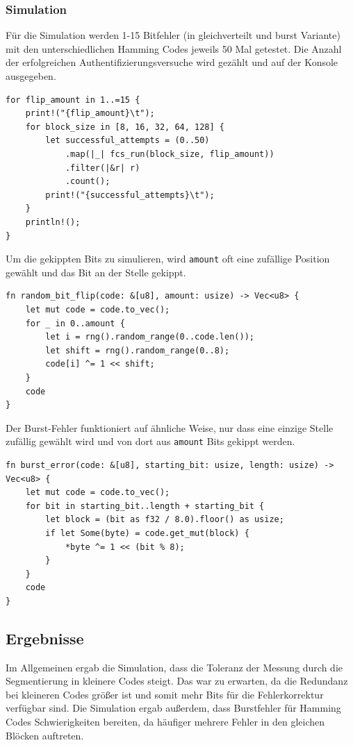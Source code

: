 \documentclass{article}
\begin{document}
    \subsubsection{Simulation}
    Für die Simulation werden 1-15 Bitfehler (in gleichverteilt und burst Variante) mit den unterschiedlichen
    Hamming Codes jeweils 50 Mal getestet. Die Anzahl der erfolgreichen Authentifizierungsversuche wird gezählt und auf
    der Konsole ausgegeben.
    \begin{verbatim}
for flip_amount in 1..=15 {
    print!("{flip_amount}\t");
    for block_size in [8, 16, 32, 64, 128] {
        let successful_attempts = (0..50)
            .map(|_| fcs_run(block_size, flip_amount))
            .filter(|&r| r)
            .count();
        print!("{successful_attempts}\t");
    }
    println!();
}
    \end{verbatim}
    Um die gekippten Bits zu simulieren, wird \verb|amount| oft eine zufällige Position gewählt und das Bit 
    an der Stelle gekippt.
    \begin{verbatim}
fn random_bit_flip(code: &[u8], amount: usize) -> Vec<u8> {
    let mut code = code.to_vec();
    for _ in 0..amount {
        let i = rng().random_range(0..code.len());
        let shift = rng().random_range(0..8);
        code[i] ^= 1 << shift;
    }
    code
}
    \end{verbatim}
    Der Burst-Fehler funktioniert auf ähnliche Weise, nur dass eine einzige Stelle zufällig gewählt wird und von
    dort aus \verb|amount| Bits gekippt werden.
    \begin{verbatim}
fn burst_error(code: &[u8], starting_bit: usize, length: usize) -> Vec<u8> {
    let mut code = code.to_vec();
    for bit in starting_bit..length + starting_bit {
        let block = (bit as f32 / 8.0).floor() as usize;
        if let Some(byte) = code.get_mut(block) {
            *byte ^= 1 << (bit % 8);
        }
    }
    code
}
    \end{verbatim}
    \subsection{Ergebnisse}
    Im Allgemeinen ergab die Simulation, dass die Toleranz der Messung durch die Segmentierung in kleinere Codes
    steigt. Das war zu erwarten, da die Redundanz bei kleineren Codes größer ist und somit mehr Bits für die
    Fehlerkorrektur verfügbar sind. Die Simulation ergab außerdem, dass Burstfehler für Hamming Codes Schwierigkeiten
    bereiten, da häufiger mehrere Fehler in den gleichen Blöcken auftreten.
\end{document}
